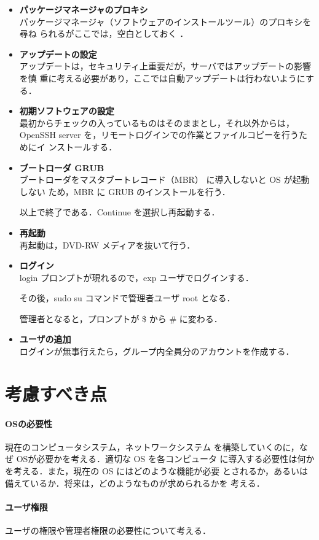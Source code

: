\begin{itemize}
\item{\bf パッケージマネージャのプロキシ}\\

パッケージマネージャ（ソフトウェアのインストールツール）のプロキシを尋ね
られるがここでは，空白としておく%
．

\item{\bf アップデートの設定}\\

アップデートは，セキュリティ上重要だが，サーバではアップデートの影響を慎
重に考える必要があり，ここでは自動アップデートは行わないようにする．

\item{\bf 初期ソフトウェアの設定}\\

最初からチェックの入っているものはそのままとし，それ以外からは，OpenSSH
     server を，リモートログインでの作業とファイルコピーを行うためにイ
     ンストールする．

\item{\bf ブートローダ GRUB}\\

ブートローダをマスタブートレコード（MBR） に導入しないと OS が起動しない
     ため，MBR に GRUB のインストールを行う．

以上で終了である．Continue を選択し再起動する．

\item{\bf 再起動}\\
再起動は，DVD-RW メディアを抜いて行う．

\item{\bf ログイン}\\
login プロンプトが現れるので，exp ユーザでログインする．

その後，sudo su コマンドで管理者ユーザ root となる．


管理者となると，プロンプトが \$ から \# に変わる．

\item{\bf ユーザの追加}\\
ログインが無事行えたら，グループ内全員分のアカウントを作成する．

\end{itemize}


\section{考慮すべき点}

\paragraph{OSの必要性} 現在のコンピュータシステム，ネットワークシステム
を構築していくのに，なぜ OSが必要かを考える．適切な OS を各コンピュータ
に導入する必要性は何かを考える．また，現在の OS にはどのような機能が必要
とされるか，あるいは備えているか．将来は，どのようなものが求められるかを
考える．

\paragraph{ユーザ権限} ユーザの権限や管理者権限の必要性について考える．

